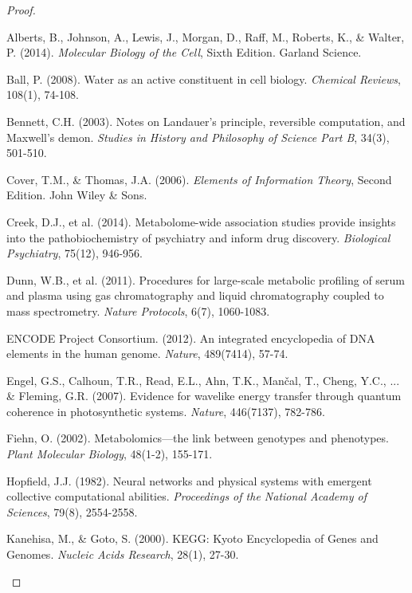 \documentclass[12pt,a4paper]{article}
\begin{document}
\begin{proof}
\begin{thebibliography}{99}

Alberts, B., Johnson, A., Lewis, J., Morgan, D., Raff, M., Roberts, K., \& Walter, P. (2014). \textit{Molecular Biology of the Cell}, Sixth Edition. Garland Science.

Ball, P. (2008). Water as an active constituent in cell biology. \textit{Chemical Reviews}, 108(1), 74-108.

Bennett, C.H. (2003). Notes on Landauer's principle, reversible computation, and Maxwell's demon. \textit{Studies in History and Philosophy of Science Part B}, 34(3), 501-510.

Cover, T.M., \& Thomas, J.A. (2006). \textit{Elements of Information Theory}, Second Edition. John Wiley \& Sons.

Creek, D.J., et al. (2014). Metabolome-wide association studies provide insights into the pathobiochemistry of psychiatry and inform drug discovery. \textit{Biological Psychiatry}, 75(12), 946-956.

Dunn, W.B., et al. (2011). Procedures for large-scale metabolic profiling of serum and plasma using gas chromatography and liquid chromatography coupled to mass spectrometry. \textit{Nature Protocols}, 6(7), 1060-1083.

ENCODE Project Consortium. (2012). An integrated encyclopedia of DNA elements in the human genome. \textit{Nature}, 489(7414), 57-74.

Engel, G.S., Calhoun, T.R., Read, E.L., Ahn, T.K., Mančal, T., Cheng, Y.C., ... \& Fleming, G.R. (2007). Evidence for wavelike energy transfer through quantum coherence in photosynthetic systems. \textit{Nature}, 446(7137), 782-786.

Fiehn, O. (2002). Metabolomics—the link between genotypes and phenotypes. \textit{Plant Molecular Biology}, 48(1-2), 155-171.

Hopfield, J.J. (1982). Neural networks and physical systems with emergent collective computational abilities. \textit{Proceedings of the National Academy of Sciences}, 79(8), 2554-2558.

Kanehisa, M., \& Goto, S. (2000). KEGG: Kyoto Encyclopedia of Genes and Genomes. \textit{Nucleic Acids Research}, 28(1), 27-30.


\end{thebibliography}
\end{proof}
\end{document}
